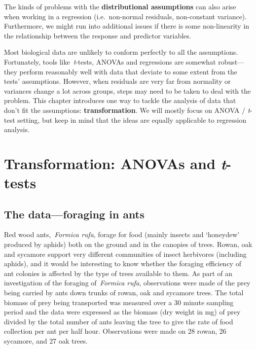 \documentclass[
]{book}
\begin{document}
The kinds of problems with the \textbf{distributional assumptions} can also arise when working in a regression (i.e.~non-normal residuals, non-constant variance). Furthermore, we might run into additional issues if there is some non-linearity in the relationship between the response and predictor variables.

Most biological data are unlikely to conform perfectly to all the assumptions. Fortunately, tools like~\emph{t}-tests, ANOVAs and regressions are somewhat robust---they perform reasonably well with data that deviate to some extent from the tests' assumptions. However, when residuals are very far from normality or variances change a lot across groups, steps may need to be taken to deal with the problem. This chapter introduces one way to tackle the analysis of data that don't fit the assumptions: \textbf{transformation}. We will mostly focus on ANOVA / \emph{t}-test setting, but keep in mind that the ideas are equally applicable to regression analysis.

\hypertarget{ant-eg}{%
\section{\texorpdfstring{Transformation: ANOVAs and \emph{t}-tests}{Transformation: ANOVAs and t-tests}}\label{ant-eg}}

\hypertarget{the-dataforaging-in-ants}{%
\subsection{The data---foraging in ants}\label{the-dataforaging-in-ants}}

Red wood ants,~\emph{Formica rufa}, forage for food (mainly insects and `honeydew' produced by aphids) both on the ground and in the canopies of trees. Rowan, oak and sycamore support very different communities of insect herbivores (including aphids), and it would be interesting to know whether the foraging efficiency of ant colonies is affected by the type of trees available to them. As part of an investigation of the foraging of~\emph{Formica rufa}, observations were made of the prey being carried by ants down trunks of rowan, oak and sycamore trees. The total biomass of prey being transported was measured over a 30 minute sampling period and the data were expressed as the biomass (dry weight in mg) of prey divided by the total number of ants leaving the tree to give the rate of food collection per ant per half hour. Observations were made on 28 rowan, 26 sycamore, and 27 oak trees.
\end{document}
